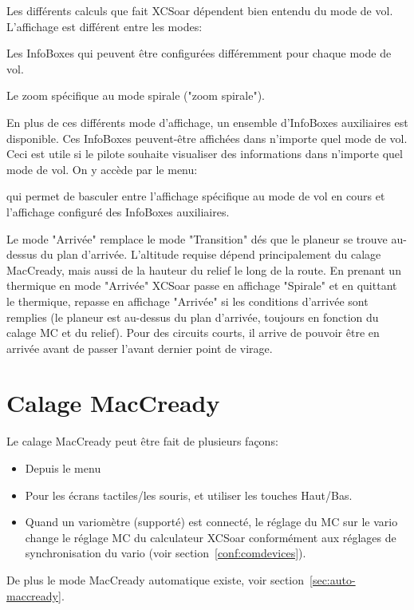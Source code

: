 Les différents calculs que fait XCSoar dépendent bien entendu du mode de vol. L'affichage est différent entre les modes:
\begin{description}
\item Les InfoBoxes  qui peuvent être configurées différemment pour chaque mode de vol.
\item Le zoom spécifique au mode spirale ("zoom spirale").
\end{description}

En plus de ces différents mode d'affichage, un ensemble d'InfoBoxes auxiliaires est disponible. Ces InfoBoxes peuvent-être affichées dans n'importe quel mode de vol. Ceci est utile si le pilote souhaite visualiser des informations dans n'importe quel mode de vol. On y accède par le menu:
\begin{quote}
\blink{}
\end{quote}

qui permet de basculer entre l'affichage spécifique au mode de vol en cours et l'affichage configuré des InfoBoxes auxiliaires.

Le mode "Arrivée" remplace le mode "Transition" dés que le planeur se trouve au-dessus du plan d'arrivée. L'altitude requise dépend principalement du calage MacCready, mais aussi de la hauteur du relief le long de la route. En prenant un thermique en mode "Arrivée"  XCSoar passe en affichage "Spirale" et en quittant le thermique, repasse en affichage "Arrivée" si les conditions d'arrivée sont remplies (le planeur est au-dessus du plan d'arrivée, toujours en fonction du calage MC et du relief). Pour des circuits courts, il arrive de pouvoir être en arrivée avant de passer l'avant dernier point de virage.

\section{Calage MacCready}

Le calage MacCready peut être fait de plusieurs façons:
\begin{itemize}
\item Depuis le menu
\begin{quote}
\blink{}
\end{quote}

\item Pour les écrans tactiles/les souris, et utiliser les touches Haut/Bas.
\item Quand un variomètre (supporté) est connecté, le réglage du MC sur le vario change le réglage MC du calculateur XCSoar conformément aux réglages de synchronisation du vario (voir
  section~\ref{conf:comdevices}).
\end{itemize}
De plus le mode MacCready automatique existe, voir section~\ref{sec:auto-maccready}.

